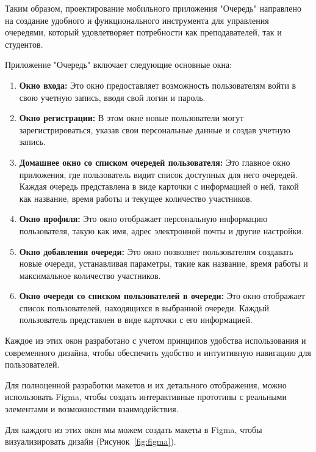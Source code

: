 Таким образом, проектирование мобильного приложения "Очередь" направлено
на создание удобного и функционального инструмента для управления очередями,
который удовлетворяет потребности как преподавателей, так и студентов.

\label{sc:designing:ui}

Приложение "Очередь" включает следующие основные окна:

\begin{enumerate}
    \item \textbf{Окно входа:} Это окно предоставляет возможность
		пользователям войти в свою учетную запись, вводя свой логин и пароль.
    \item \textbf{Окно регистрации:} В этом окне новые пользователи могут
		зарегистрироваться, указав свои персональные данные
		и создав учетную запись.
    \item \textbf{Домашнее окно со списком очередей пользователя:}
		Это главное окно приложения, где пользователь видит список доступных
		для него очередей. Каждая очередь представлена в виде карточки
		с информацией о ней, такой как название,
		время работы и текущее количество участников.
    \item \textbf{Окно профиля:} Это окно отображает персональную информацию
		пользователя, такую как имя,
		адрес электронной почты и другие настройки.
    \item \textbf{Окно добавления очереди:} Это окно позволяет пользователям
		создавать новые очереди, устанавливая параметры,
		такие как название, время работы и максимальное количество участников.
    \item \textbf{Окно очереди со списком пользователей в очереди:}
		Это окно отображает список пользователей, находящихся
		в выбранной очереди. Каждый пользователь представлен в виде карточки
		с его информацией.
\end{enumerate}

Каждое из этих окон разработано с учетом принципов удобства использования
и современного дизайна, чтобы обеспечить удобство и интуитивную навигацию
для пользователей.\par
Для полноценной разработки макетов и их детального отображения,
можно использовать Figma, чтобы создать интерактивные прототипы
с реальными элементами и возможностями взаимодействия.\par
Для каждого из этих окон мы можем создать макеты в Figma,
чтобы визуализировать дизайн (Рисунок~\ref{fig:figma}).

